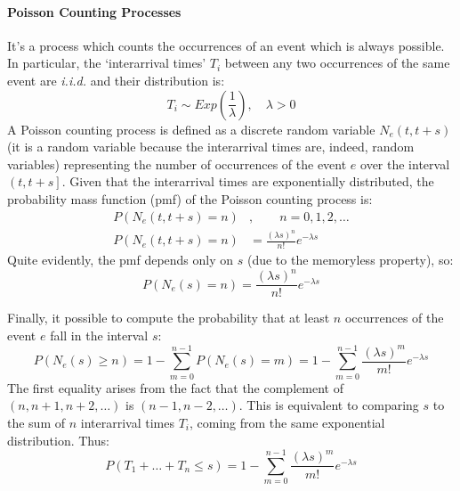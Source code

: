 \documentclass[12pt,a4paper]{article}
\begin{document}
\paragraph{Poisson Counting Processes} It's a process which counts the occurrences of an event which is always possible. In particular, the `interarrival times' $T_i$ between any two occurrences of the same event are \textit{i.i.d.} and their distribution is:
$$
T_i\sim Exp\left(\frac{1}{\lambda}\right), \quad \lambda > 0
$$
\noindent
A Poisson counting process is defined as a discrete random variable $N_e(t,t+s)$ (it is a random variable because the interarrival times are, indeed, random variables) representing the number of occurrences of the event $e$ over the interval $\left( t,t+s\right]$. Given that the interarrival times are exponentially distributed, the probability mass function (pmf) of the Poisson counting process is:
\begin{equation*}
\begin{split}
P\left(N_e(t,t+s)=n\right)&, \qquad n = 0,1,2,\dots \\
P\left(N_e(t,t+s)=n\right)& = \frac{(\lambda s)^n}{n!}e^{-\lambda s}
\end{split}
\end{equation*}
Quite evidently, the pmf depends only on $s$ (due to the memoryless property), so:
\begin{equation}
\label{eq:poissonCountingDef}
P\left(N_e(s)=n\right) = \frac{(\lambda s)^n}{n!}e^{-\lambda s}
\end{equation}

\noindent
Finally, it possible to compute the probability that at least $n$ occurrences of the event $e$ fall in the interval $s$:
$$
P\left(N_e(s) \geq n\right) = 1 - \sum_{m=0}^{n-1}P\left(N_e(s) = m \right) = 1 - \sum_{m=0}^{n-1} \frac{(\lambda s)^m}{m!}e^{-\lambda s}
$$
The first equality arises from the fact that the complement of $(n,n+1,n+2,\dots)$ is $(n-1,n-2,\dots)$. This is equivalent to comparing $s$ to the sum of $n$ interarrival times $T_i$, coming from the same exponential distribution. Thus:
$$
P(T_1 + \dots + T_n \leq s) = 1 - \sum_{m=0}^{n-1} \frac{(\lambda s)^m}{m!}e^{-\lambda s}
$$
\newpage
\end{document}
